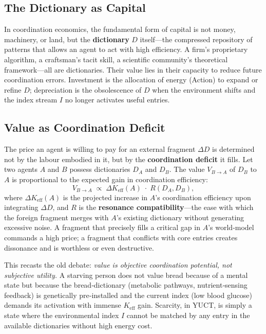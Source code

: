 \documentclass[12pt,a4paper]{article}
\newcommand{\Keff}{K_{\mathrm{eff}}}
\begin{document}
	\subsection{The Dictionary as Capital}
	
	In coordination economics, the fundamental form of capital is not money, machinery, or land, but the \textbf{dictionary} $D$ itself---the compressed repository of patterns that allows an agent to act with high efficiency. A firm’s proprietary algorithm, a craftsman’s tacit skill, a scientific community’s theoretical framework---all are dictionaries. Their value lies in their capacity to reduce future coordination errors. Investment is the allocation of energy (Action) to expand or refine $D$; depreciation is the obsolescence of $D$ when the environment shifts and the index stream $I$ no longer activates useful entries.
	
	\subsection{Value as Coordination Deficit}
	
	The price an agent is willing to pay for an external fragment $\Delta D$ is determined not by the labour embodied in it, but by the \textbf{coordination deficit} it fills. Let two agents $A$ and $B$ possess dictionaries $D_A$ and $D_B$. The value $V_{B \rightarrow A}$ of $D_B$ to $A$ is proportional to the expected gain in coordination efficiency:
	\[
	V_{B \rightarrow A} \; \propto \; \Delta\Keff(A) \; \cdot \; R(D_A, D_B),
	\]
	where $\Delta\Keff(A)$ is the projected increase in $A$'s coordination efficiency upon integrating $\Delta D$, and $R$ is the \textbf{resonance compatibility}—the ease with which the foreign fragment merges with $A$'s existing dictionary without generating excessive noise. A fragment that precisely fills a critical gap in $A$'s world‑model commands a high price; a fragment that conflicts with core entries creates dissonance and is worthless or even destructive.
	
	This recasts the old debate: \emph{value is objective coordination potential, not subjective utility.} A starving person does not value bread because of a mental state but because the bread‑dictionary (metabolic pathways, nutrient‑sensing feedback) is genetically pre‑installed and the current index (low blood glucose) demands its activation with immense $K_{\mathrm{eff}}$ gain. Scarcity, in YUCT, is simply a state where the environmental index $I$ cannot be matched by any entry in the available dictionaries without high energy cost.
	
\end{document}
